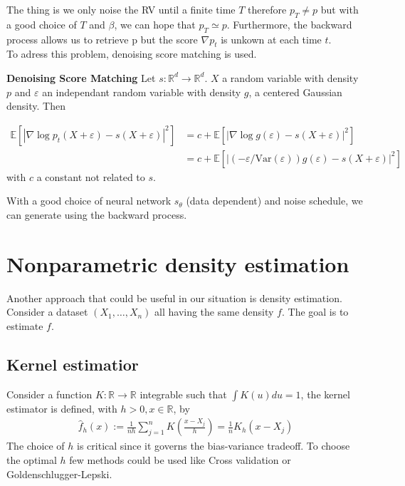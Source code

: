 \documentclass{article}
\begin{document}
The thing is we only noise the RV until a finite time \(T\) therefore \(p_T\not= p\) but with a good choice of \(T\) and \(\beta\), we can hope that \(p_T\simeq p\). Furthermore, the backward process allows us to retrieve p but the score \(\nabla p_t\) is unkown at each time \(t\). \\
To adress this problem, denoising score matching is used.  

\bigskip
\textbf{Denoising Score Matching} \newline
Let \(s:\mathbb{R}^d\rightarrow\mathbb{R}^d\). \(X\) a random variable with density \(p\) and \(\varepsilon\) an independant random variable with density \(g\), a centered Gaussian density. Then 

\begin{align}
    \mathbb{E}[|\nabla \log p_t (X+\varepsilon)-s(X+\varepsilon)|^2]&=c+\mathbb{E}[|\nabla \log g(\varepsilon)-s(X+\varepsilon)|^2]\\
    &=c+\mathbb{E}[|(-\varepsilon/\text{Var} (\varepsilon))g(\varepsilon)-s(X+\varepsilon)|^2]
\end{align}
with \(c\) a constant not related to \(s\).

With a good choice of neural network \(s_\theta\) (data dependent) and noise schedule, we can generate using the backward process.


\section{Nonparametric density estimation}
Another approach that could be useful in our situation is density estimation. Consider a dataset \((X_1,\ldots,X_n)\) all having the same density \(f\). The goal is to estimate \(f\). 

\subsection{Kernel estimatior}
Consider a function \(K:\mathbb{R}\rightarrow\mathbb{R}\) integrable such that \(\int K(u)du=1\), the kernel estimator is defined, with \(h>0, x\in\mathbb{R}\), by 
\begin{align}
\hat{f}_h(x):=\frac{1}{nh}\sum_{j=1}^n K(\frac{x-X_j}{h})=\frac{1}{n}K_h(x-X_j)
\end{align}
The choice of \(h\) is critical since it governs the bias-variance tradeoff. To choose the optimal \(h\) few methods could be used like Cross validation or Goldenschlugger-Lepski.
\end{document}
